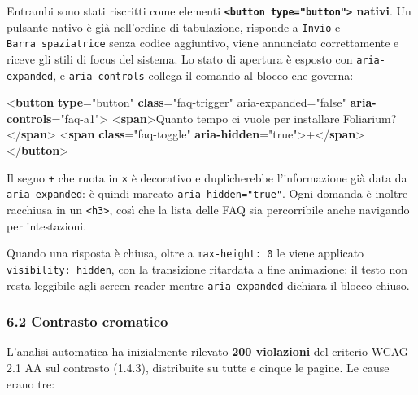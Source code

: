 \documentclass[
  11pt,
]{article}
\newenvironment{Shaded}{\begin{snugshade}}{\end{snugshade}}
\newcommand{\DataTypeTok}[1]{\textcolor[rgb]{0.13,0.29,0.53}{#1}}
\newcommand{\ErrorTok}[1]{\textcolor[rgb]{0.64,0.00,0.00}{\textbf{#1}}}
\newcommand{\KeywordTok}[1]{\textcolor[rgb]{0.13,0.29,0.53}{\textbf{#1}}}
\newcommand{\NormalTok}[1]{#1}
\newcommand{\OtherTok}[1]{\textcolor[rgb]{0.56,0.35,0.01}{#1}}
\newcommand{\StringTok}[1]{\textcolor[rgb]{0.31,0.60,0.02}{#1}}
\begin{document}
Entrambi sono stati riscritti come elementi
\textbf{\texttt{\textless{}button\ type="button"\textgreater{}} nativi}.
Un pulsante nativo è già nell'ordine di tabulazione, risponde a
\texttt{Invio} e \texttt{Barra\ spaziatrice} senza codice aggiuntivo,
viene annunciato correttamente e riceve gli stili di focus del sistema.
Lo stato di apertura è esposto con \texttt{aria-expanded}, e
\texttt{aria-controls} collega il comando al blocco che governa:

\begin{Shaded}
\begin{Highlighting}[]
\DataTypeTok{\textless{}}\KeywordTok{button} \ErrorTok{type}\OtherTok{=}\StringTok{"button"} \ErrorTok{class}\OtherTok{=}\StringTok{"faq{-}trigger"}
\OtherTok{        aria{-}expanded=}\StringTok{"false"} \ErrorTok{aria{-}controls}\OtherTok{=}\StringTok{"faq{-}a1"}\DataTypeTok{\textgreater{}}
  \DataTypeTok{\textless{}}\KeywordTok{span}\DataTypeTok{\textgreater{}}\NormalTok{Quanto tempo ci vuole per installare Foliarium?}\DataTypeTok{\textless{}/}\KeywordTok{span}\DataTypeTok{\textgreater{}}
  \DataTypeTok{\textless{}}\KeywordTok{span} \ErrorTok{class}\OtherTok{=}\StringTok{"faq{-}toggle"} \ErrorTok{aria{-}hidden}\OtherTok{=}\StringTok{"true"}\DataTypeTok{\textgreater{}}\NormalTok{+}\DataTypeTok{\textless{}/}\KeywordTok{span}\DataTypeTok{\textgreater{}}
\DataTypeTok{\textless{}/}\KeywordTok{button}\DataTypeTok{\textgreater{}}
\end{Highlighting}
\end{Shaded}

Il segno \texttt{+} che ruota in \texttt{×} è decorativo e duplicherebbe
l'informazione già data da \texttt{aria-expanded}: è quindi marcato
\texttt{aria-hidden="true"}. Ogni domanda è inoltre racchiusa in un
\texttt{\textless{}h3\textgreater{}}, così che la lista delle FAQ sia
percorribile anche navigando per intestazioni.

Quando una risposta è chiusa, oltre a \texttt{max-height:\ 0} le viene
applicato \texttt{visibility:\ hidden}, con la transizione ritardata a
fine animazione: il testo non resta leggibile agli screen reader mentre
\texttt{aria-expanded} dichiara il blocco chiuso.

\hypertarget{contrasto-cromatico}{%
\subsubsection{6.2 Contrasto cromatico}\label{contrasto-cromatico}}

L'analisi automatica ha inizialmente rilevato \textbf{200 violazioni}
del criterio WCAG 2.1 AA sul contrasto (1.4.3), distribuite su tutte e
cinque le pagine. Le cause erano tre:
\end{document}
